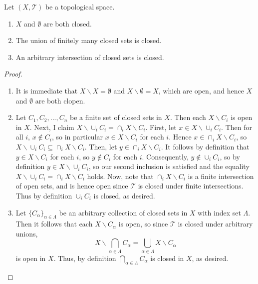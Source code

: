 \documentclass[12pt, a4paper, oneside, openright, titlepage]{book}
\begin{document}
\begin{prop}
    Let $(X,\mathcal{T})$ be a topological space.\begin{enumerate}
        \item $X$ and $\emptyset$ are both closed.
        \item The union of finitely many closed sets is closed.
        \item An arbitrary intersection of closed sets is closed.
    \end{enumerate}
\end{prop}
\begin{proof}
    \leavevmode
    \begin{enumerate}
        \item It is immediate that $X\backslash X = \emptyset$ and $X\backslash \emptyset = X$, which are open, and hence $X$ and $\emptyset$ are both clopen.
        \item Let $C_1,C_2,...,C_n$ be a finite set of closed sets in $X$. Then each $X\backslash C_i$ is open in $X$. Next, I claim $X\backslash \cup_iC_i = \cap_iX\backslash C_i$. First, let $x \in X\backslash \cup_iC_i$. Then for all $i$, $x \notin C_i$, so in particular $x \in X\backslash C_i$ for each $i$. Hence $x \in \cap_iX\backslash C_i$, so $X\backslash \cup_iC_i \subseteq \cap_iX\backslash C_i$. Then, let $y \in \cap_iX\backslash C_i$. It follows by definition that $y \in X\backslash C_i$ for each $i$, so $y \notin C_i$ for each $i$. Consequently, $y \notin \cup_iC_i$, so by definition $y \in X\backslash \cup_iC_i$, so our second inclusion is satisfied and the equality $X\backslash \cup_iC_i = \cap_iX\backslash C_i$ holds. Now, note that $\cap_iX\backslash C_i$ is a finite intersection of open sets, and is hence open since $\mathcal{T}$ is closed under finite intersections. Thus by definition $\cup_iC_i$ is closed, as desired.
        \item Let $\{C_{\alpha}\}_{\alpha \in \Lambda}$ be an arbitrary collection of closed sets in $X$ with index set $\Lambda$. Then it follows that each $X\backslash C_{\alpha}$ is open, so since $\mathcal{T}$ is closed under arbitrary unions, \begin{equation*}
                X\backslash\bigcap_{\alpha \in \Lambda}C_{\alpha} = \bigcup_{\alpha\in\Lambda}X\backslash C_{\alpha}
        \end{equation*}
            is open in $X$. Thus, by definition $\bigcap_{\alpha\in\Lambda}C_{\alpha}$ is closed in $X$, as desired.
    \end{enumerate}
\end{proof}
\end{document}
